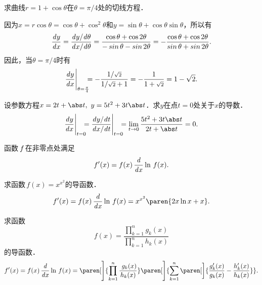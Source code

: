 \begin{example*}
  求曲线\(r = 1 + \cos\theta\)在\(\theta = \pi/4\)处的切线方程．

  \begin{remark}
    因为\(x = r \cos\theta = \cos\theta + \cos^2\theta\)和\(y = \sin\theta + \cos\theta \sin\theta\)，所以有
    \begin{equation*}
      \dydx
      = \frac{\dy/\!\dtheta}{\dx/\!\dtheta}
      = \frac{\cos\theta + \cos2\theta}{-\sin\theta - \sin2\theta}
      = - \frac{\cos\theta + \cos2\theta}{\sin\theta + \sin2\theta}.
    \end{equation*}
    因此，当\(\theta = \pi/4\)时有
    \begin{equation*}
      \frac{\mathop{}\!\mathit{d} y}{\mathop{}\!\mathit{d} x}\Bigg\vert_{\theta=\frac\pi4} \mkern-11mu
      = - \frac{1/{\scriptstyle\sqrt2}}{1/{\scriptstyle\sqrt2} + 1}
      = - \frac{1}{1 + {\scriptstyle\sqrt2}}
      = 1 - \sqrt2.
    \end{equation*}
  \end{remark}
\end{example*}

\begin{example*}
  设参数方程\(x = 2t + \abs t,\ y = 5t^2 + 3t\abs t\)．求\(y\)在点\(t = 0\)处关于\(x\)的导数．
  \begin{equation*}
    \dydx\Bigg\vert_{t=0} \mkern-11mu
    = \frac{\dy/\!\dt}{\dx/\!\dt} \Bigg\vert_{t=0} \mkern-11mu
    = \lim_{t\to0} \frac{5t^2 + 3t\abs t}{2t + \abs t}
    = 0.
  \end{equation*}
\end{example*}

\begin{theorem*}[对数求导法]
  函数\(\,f\mkern2mu\)在非零点处满足
  \begin{equation*}
    f'(x) = f(x) \,\frac{\mathop{}\!\mathit{d}}{\mathop{}\!\mathit{d} x} \ln\,f(x).
  \end{equation*}
\end{theorem*}

\begin{example*}
  求函数\(\,f(x) = x^{x^2}\)的导函数．
  \begin{equation*}
    f'(x)
    = f(x) \,\ddx \ln\,f(x)
    = x^{x^2} \paren{2x\ln x + x}.
  \end{equation*}
\end{example*}

\begin{example*}
  求函数
  \begin{equation*}
    f(x) = \frac{\prod\limits_{k=1}^n g_k(x)}{\prod\limits_{k=1}^n h_k(x)}
  \end{equation*}
  的导函数．
  \begin{equation*}
    f'(x)
    = f(x) \,\ddx \ln\,f(x)
    = \paren[\Bigg]{\prod_{k=1}^n \frac{\ g_k(x)}{h_k(x)}}
    \paren[\Bigg]{\sum_{k=1}^n \paren[\bigg]{\frac{g_k'(x)}{g_k(x)} - \frac{h_k'(x)}{h_k(x)}}}.
  \end{equation*}
\end{example*}

